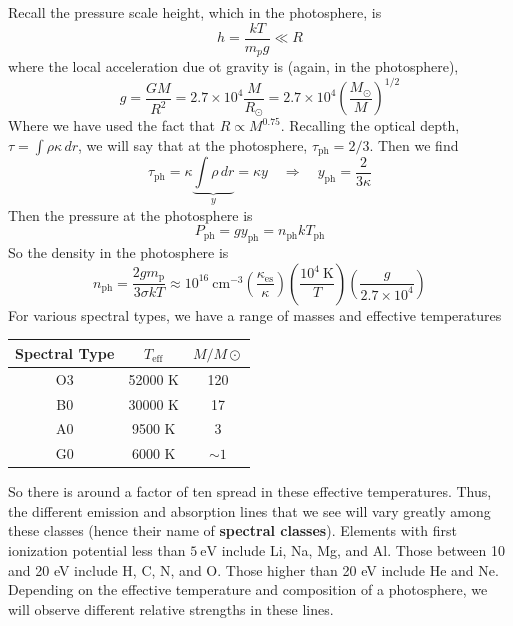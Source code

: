 \documentclass[10pt]{article}
\numberwithin{equation}{section}
\begin{document}
    Recall the pressure scale height, which in the photosphere, is
    \begin{equation}
      \label{eq:212}
      h=\frac{kT}{m_p g}\ll R
    \end{equation}
    where the local acceleration due ot gravity is (again, in the
    photosphere),
    \begin{equation}
      \label{eq:213}
      g=\frac{GM}{R^2}=2.7\times 10^4\frac{M}{R_\odot}=2.7\times
      10^4\left(\frac{M_\odot}{M}\right)^{1/2}
    \end{equation}
    Where we have used the fact that $R\propto M^{0.75}$. Recalling
    the optical depth, $\tau=\int \rho\kappa\, dr$, we will say that at
    the photosphere, $\tau_{\mathrm{ph}}=2/3$. Then we find
    \begin{equation}
      \label{eq:214}
      \tau_{\mathrm{ph}}=\kappa\underbrace{\int \rho\, dr}_{y}=\kappa
      y\quad\Rightarrow\quad y_{\mathrm{ph}}=\frac{2}{3\kappa}
    \end{equation}
    Then the pressure at the photosphere is
    \begin{equation}
      \label{eq:215}
      P_{\mathrm{ph}}=gy_{\mathrm{ph}}=n_{\mathrm{ph}}kT_{\mathrm{ph}}
    \end{equation}
    So the density in the photosphere is
    \begin{equation}
      \label{eq:216}
      n_{\mathrm{ph}}=\frac{2g m_\mathrm{p}}{3\sigma k T} \approx
      10^{16}\
        \mathrm{cm^{-3}}\left(\frac{\kappa_{\mathrm{es}}}{\kappa}\right)
\left(\frac{10^4\
          \mathrm{K}}{T}\right)\left(\frac{g}{2.7\times 10^4}\right)
    \end{equation}
    For various spectral types, we have a range of masses and
    effective temperatures\\
    \begin{center}
    \begin{tabular}[h]{c c c}
      Spectral Type & $T_{\mathrm{eff}}$ & $M/M\odot$\\
      \hline\hline
      O3 & 52000 K & 120\\
      B0 & 30000 K & 17\\
      A0 & 9500 K & 3\\
      G0 & 6000 K & $\sim 1$
    \end{tabular}
    \end{center}
    So there is around a factor of ten spread in these effective
    temperatures. Thus, the different emission and absorption lines
    that we see will vary greatly among these classes (hence their
    name of \textbf{spectral classes}). Elements with first
    ionization potential less than $5\ \mathrm{eV}$ include Li, Na,
    Mg, and Al. Those between 10 and 20 eV include H, C, N, and
    O. Those higher than 20 eV include He and Ne. Depending on the
    effective temperature and composition of a photosphere, we will
    observe different relative strengths in these lines.\\
\end{document}
